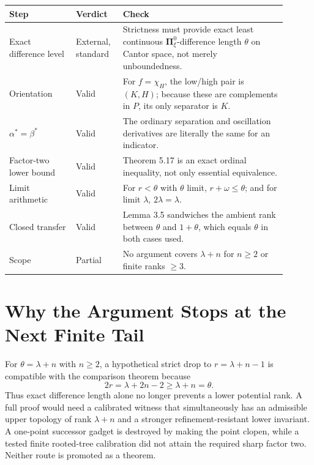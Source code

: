 \documentclass[11pt]{article}
\newcommand{\bPi}{\boldsymbol{\Pi}}
\begin{document}
\begin{center}
\small
\begin{tabular}{>{\raggedright\arraybackslash}p{0.22\linewidth}
                >{\raggedright\arraybackslash}p{0.14\linewidth}
                >{\raggedright\arraybackslash}p{0.54\linewidth}}
\toprule
Step & Verdict & Check \\
\midrule
Exact difference level & External, standard & Strictness must provide exact least continuous $\bPi^0_\xi$-difference length $\theta$ on Cantor space, not merely unboundedness. \\
Orientation & Valid & For $f=\chi_H$, the low/high pair is $(K,H)$; because these are complements in $P$, its only separator is $K$. \\
$\alpha^*=\beta^*$ & Valid & The ordinary separation and oscillation derivatives are literally the same for an indicator. \\
Factor-two lower bound & Valid & Theorem 5.17 is an exact ordinal inequality, not only essential equivalence. \\
Limit arithmetic & Valid & For $r<\theta$ with $\theta$ limit, $r+\omega\leq\theta$; and for limit $\lambda$, $2\lambda=\lambda$. \\
Closed transfer & Valid & Lemma 3.5 sandwiches the ambient rank between $\theta$ and $1+\theta$, which equals $\theta$ in both cases used. \\
Scope & Partial & No argument covers $\lambda+n$ for $n\geq2$ or finite ranks $\geq3$. \\
\bottomrule
\end{tabular}
\end{center}

\section*{Why the Argument Stops at the Next Finite Tail}

For $\theta=\lambda+n$ with $n\geq2$, a hypothetical strict drop to
$r=\lambda+n-1$ is compatible with the comparison theorem because
\[
  2r=\lambda+2n-2\geq\lambda+n=\theta.
\]
Thus exact difference length alone no longer prevents a lower potential
rank.  A full proof would need a calibrated witness that simultaneously has
an admissible upper topology of rank $\lambda+n$ and a stronger
refinement-resistant lower invariant.  A one-point successor gadget is
destroyed by making the point clopen, while a tested finite rooted-tree
calibration did not attain the required sharp factor two.  Neither route is
promoted as a theorem.
\end{document}

